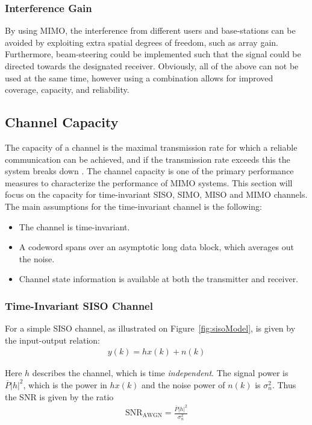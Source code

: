 \subsubsection{Interference Gain}
By using MIMO, the interference from different users and base-stations can be avoided by exploiting extra spatial degrees of freedom, such as array gain. Furthermore, beam-steering could be implemented such that the signal could be directed towards the designated receiver. Obviously, all of the above can not be used at the same time, however using a combination  allows for improved coverage, capacity, and reliability. \cite{Tim2012Practical} 

\subsection{Channel Capacity}
\def\snr{\text{SNR}_{\text{AWGN}}}
\def\PP{\overline{P}}
\def\CC{C_{\text{AWGN}}}

The capacity of a channel is the maximal transmission rate for which a reliable communication can be achieved, and if the transmission rate exceeds this the system breaks down \cite{Tim2012Practical}. The channel capacity is one of the primary performance measures to characterize the performance of MIMO systems\cite{Tim2012Practical}. This section will focus on the capacity for time-invariant SISO, SIMO, MISO and MIMO channels. The main assumptions for the time-invariant channel is the following\cite{Tim2012Practical}: 
\begin{itemize}
\item The channel is time-invariant.
\item A codeword spans over an asymptotic long data block, which averages out the noise.
\item Channel state information is available at both the transmitter and receiver. 
\end{itemize}

\subsubsection{Time-Invariant SISO Channel}
For a simple SISO channel, as illustrated on Figure~\ref{fig:sisoModel}, is given by the input-output relation:
\begin{align*}
  y(k) = h x(k) + n(k)
\end{align*}

Here $h$ describes the channel, which is time \emph{independent}. The signal power is $\PP |h|^2$, which is the power in $h x(k)$ and the noise power of $n(k)$ is $\sigma_n^2$. Thus the SNR is given by the ratio\cite{Tim2012Practical}
\begin{align*}
  \snr = \frac{\PP |h|^2}{\sigma_n^2}
\end{align*}

